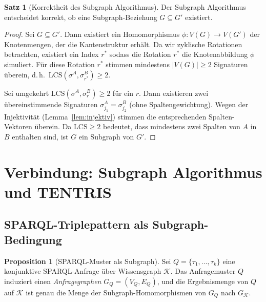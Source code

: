 ﻿\documentclass[a4paper,12pt]{article}
\theoremstyle{definition}
\newtheorem{satz}{Satz}
\newtheorem{proposition}{Proposition}
\begin{document}
\begin{satz}[Korrektheit des Subgraph Algorithmus]
\label{satz:korrektheit}
Der Subgraph Algorithmus entscheidet korrekt, ob eine Subgraph-Beziehung
$G \subseteq G'$ existiert.
\end{satz}

\begin{proof}
Sei $G \subseteq G'$. Dann existiert ein Homomorphismus $\phi: V(G) \to V(G')$
der Knotenmengen, der die Kantenstruktur erhält. Da wir zyklische Rotationen
betrachten, existiert ein Index $r^*$ sodass die Rotation $r^*$ die Knotenabbildung
$\phi$ simuliert. Für diese Rotation $r^*$ stimmen mindestens $|V(G)| \geq 2$ Signaturen
überein, d.\,h.\ $\mathrm{LCS}(\sigma^A, \sigma^B_{r^*}) \geq 2$.

Sei umgekehrt $\mathrm{LCS}(\sigma^A, \sigma^B_r) \geq 2$ für ein $r$. Dann existieren
zwei übereinstimmende Signaturen $\sigma_{j_1}^A = \sigma_{j_2}^B$ (ohne Spaltengewichtung).
Wegen der Injektivität (Lemma~\ref{lem:injektiv}) stimmen die entsprechenden
Spalten-Vektoren überein. Da $\mathrm{LCS} \geq 2$ bedeutet, dass mindestens zwei
Spalten von $A$ in $B$ enthalten sind, ist $G$ ein Subgraph von $G'$.
\end{proof}

\section{Verbindung: Subgraph Algorithmus und TENTRIS}
\label{sec:verbindung}

\subsection{SPARQL-Triplepattern als Subgraph-Bedingung}

\begin{proposition}[SPARQL-Muster als Subgraph]
\label{prop:sparql_subgraph}
Sei $Q = \{\tau_1, \ldots, \tau_k\}$ eine konjunktive SPARQL-Anfrage über
Wissensgraph $\mathcal{K}$. Das Anfragemuster $Q$ induziert einen
\emph{Anfragegraphen} $G_Q = (V_Q, E_Q)$, und die Ergebnismenge von $Q$ auf
$\mathcal{K}$ ist genau die Menge der Subgraph-Homomorphismen von $G_Q$ nach
$G_{\mathcal{K}}$.
\end{proposition}
\end{document}
